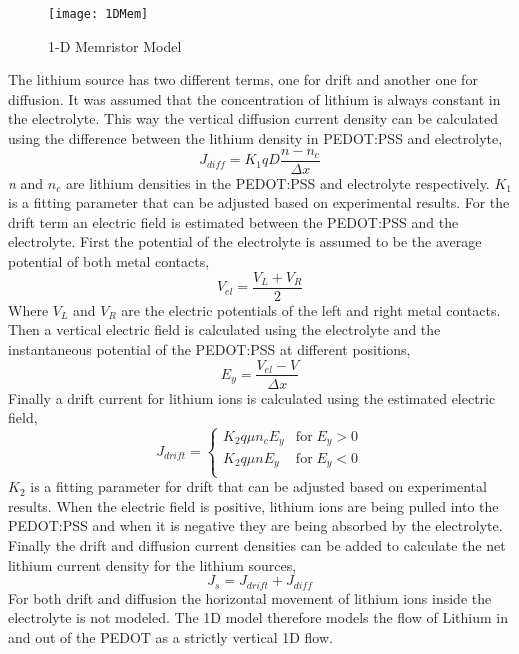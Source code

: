 \begin{doublespace}
 
\begin{figure}[!htp]
\centering
\texttt{[image: 1DMem]}
\caption{1-D Memristor Model} 
\label{MemStc15}
\end{figure}


The lithium source has two different terms, one for drift and another one for diffusion. It was assumed that the concentration of lithium is always constant in the electrolyte. This way the vertical diffusion current density can be calculated using the difference between the lithium density in PEDOT:PSS and electrolyte,
\begin{equation}
J_{diff} = K_1 q D  \frac{n - n_c}{\Delta x}
\end{equation}
\textit{n} and \textit{$n_c$} are lithium densities in the PEDOT:PSS and electrolyte respectively. \textit{$K_1$} is a fitting parameter that can be adjusted based on experimental results. For the drift term an electric field is estimated between the PEDOT:PSS and the electrolyte. First the potential of the electrolyte is assumed to be the average potential of both metal contacts, 
\begin{equation}
V_{el} =  \frac{V_L+V_R}{2}
\end{equation}
Where $V_L $ and $V_R$ are the electric potentials of the left and right metal contacts. Then a vertical electric field is calculated using the electrolyte and the instantaneous potential of the PEDOT:PSS at different positions, 
\begin{equation}
E_{y} =  \frac{V_{el}-V }{\Delta x}
\end{equation}
Finally a drift current for lithium ions is calculated using the estimated electric field, 
\begin{equation}
J_{drift} = \begin{cases}
        K_2 q \mu n_c E_y  & \text{for} \;  E_y>0  \\
        K_2 q \mu n E_y   &  \text{for} \;  E_y<0  \\
     \end{cases}
\end{equation}
\textit{$K_2$} is a fitting parameter for drift that can be adjusted based on experimental results. When the electric field is positive, lithium ions are being pulled into the PEDOT:PSS and when it is negative they are being absorbed by the electrolyte. Finally the drift and diffusion current densities can be added to calculate the net lithium current density for the lithium sources,
\begin{equation}
J_{s} =  J_{drift}+J_{diff}
\end{equation}
For both drift and diffusion the horizontal movement of lithium ions inside the electrolyte is not modeled. The 1D model therefore models the flow of Lithium in and out of the PEDOT as a strictly vertical 1D flow.



\end{doublespace}
